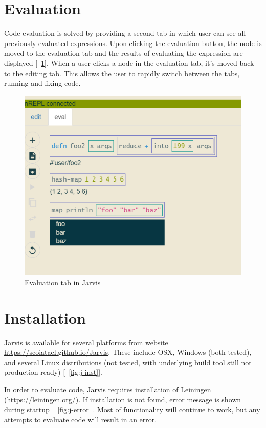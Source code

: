 \documentclass[english,mgr,shortabstract]{iithesis}
\newcommand*{\figref}[1]{[\textbf{\figurename}~\ref{#1}]}
\begin{document}
\section{Evaluation}
Code evaluation is solved by providing a second tab in which user can see all
previously evaluated expressions.
Upon clicking the evaluation button, the node is moved to the evaluation tab and
the results of evaluating the expression are displayed \figref{fig:j-eval}.
When a user clicks a node in the evaluation tab, it’s moved back to the editing
tab.
This allows the user to rapidly switch between the tabs, running and fixing
code.


\begin{figure}[hbt]
  \centering
  \includegraphics[scale=0.3]{img/j-eval_f}
  \caption{Evaluation tab in Jarvis}
\label{fig:j-eval}
\end{figure}

\section{Installation}
Jarvis is available for several platforms from website
\url{https://scoiatael.github.io/Jarvis}. These include OSX, Windows (both
tested), and several Linux distributions (not tested, with underlying build tool
still not production-ready) \figref{fig:j-inst}.

In order to evaluate code, Jarvis requires installation of Leiningen
(\url{https://leiningen.org/}).
If installation is not found, error message is shown during startup
\figref{fig:j-error}. Most of functionality will continue to work, but any attempts
to evaluate code will result in an error.
\end{document}
